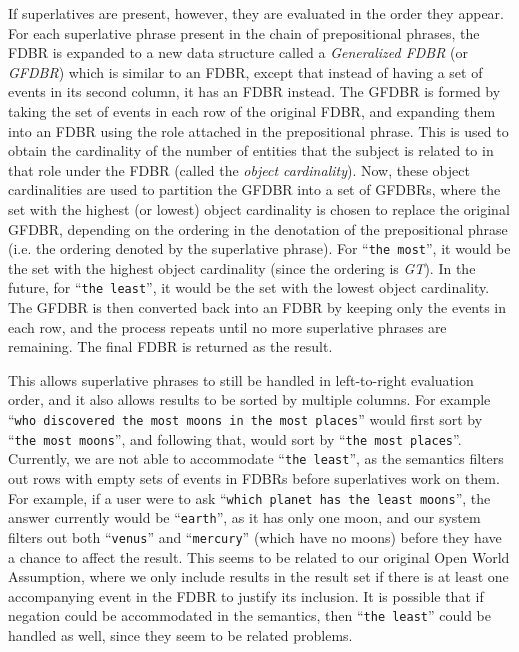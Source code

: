 \documentclass[../main.tex]{subfiles}
\begin{document}
\begin{refsection}
If superlatives are present, however, they are evaluated in the order they appear.  For each superlative phrase present in the chain of prepositional phrases, the FDBR is expanded to a new data structure called a {\em Generalized FDBR} (or {\em GFDBR}) which is similar to an FDBR, except that instead of having a set of events in its second column, it has an FDBR instead.  The GFDBR is formed by taking the set of events in each row of the original FDBR, and expanding them into an FDBR using the role attached in the prepositional phrase.  This is used to obtain the cardinality of the number of entities that the subject is related to in that role under the FDBR (called the {\em object cardinality}).  Now, these object cardinalities are used to partition the GFDBR into a set of GFDBRs, where the set with the highest (or lowest) object cardinality is chosen to replace the original GFDBR, depending on the ordering in the denotation of the prepositional phrase (i.e. the ordering denoted by the superlative phrase).  For ``\texttt{the most}'', it would be the set with the highest object cardinality (since the ordering is \textit{GT}).  In the future, for ``\texttt{the least}'', it would be the set with the lowest object cardinality.  The GFDBR is then converted back into an FDBR by keeping only the events in each row, and the process repeats until no more superlative phrases are remaining.  The final FDBR is returned as the result.

This allows superlative phrases to still be handled in left-to-right evaluation order, and it also allows results to be sorted by multiple columns.  For example ``\texttt{who discovered the most moons in the most places}'' would first sort by ``\texttt{the most moons}'', and following that, would sort by ``\texttt{the most places}''. Currently, we are not able to accommodate ``\texttt{the least}'', as the semantics filters out rows with empty sets of events in FDBRs before superlatives work on them.  For example, if a user were to ask ``\texttt{which planet has the least moons}'', the answer currently would be ``\texttt{earth}'', as it has only one moon, and our system filters out both ``\texttt{venus}'' and ``\texttt{mercury}'' (which have no moons) before they have a chance to affect the result.  This seems to be related to our original Open World Assumption, where we only include results in the result set if there is at least one accompanying event in the FDBR to justify its inclusion.  It is possible that if negation could be accommodated in the semantics, then ``\texttt{the least}'' could be handled as well, since they seem to be related problems.


\end{refsection}
\end{document}
